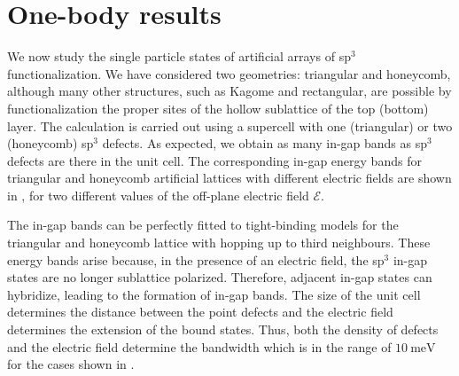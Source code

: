 \section{One-body results}
We now study the single particle states of artificial arrays of sp$^3$ functionalization. We have considered two geometries: triangular and honeycomb, although many other structures, such as Kagome and rectangular, are possible by functionalization the proper sites of the hollow sublattice of the top (bottom) layer. The calculation is carried out using a supercell
with one (triangular) or two (honeycomb) sp$^3$ defects. As expected, we obtain as many in-gap bands as sp$^3$ defects are there in the unit cell. The corresponding in-gap energy bands for triangular and honeycomb artificial lattices with different electric fields are shown in , for two different values of the off-plane electric field $\mathcal{E}$.

The in-gap bands can be perfectly fitted to tight-binding models for the triangular and honeycomb lattice with hopping up to third neighbours. These energy bands arise because, in the presence of an electric field, the sp$^3$ in-gap states are no longer sublattice polarized. Therefore, adjacent in-gap states can hybridize, leading to the formation of in-gap bands. 
The size of the unit cell determines the distance between the point defects and the electric field determines the extension of the bound states.
Thus, both the density of defects and the electric field determine the bandwidth which is in the range of $\SI{10}{\meV}$ for the cases shown in .
 
